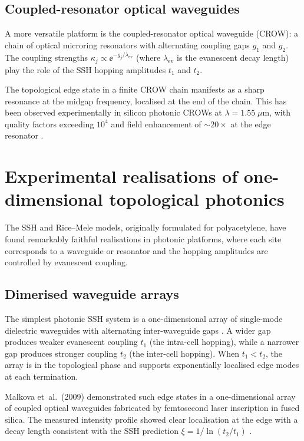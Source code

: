 \subsection{Coupled-resonator optical waveguides}
\label{sec:ch14-crow}

A more versatile platform is the coupled-resonator optical waveguide
(CROW): a chain of optical microring resonators with alternating
coupling gaps $g_1$ and $g_2$.  The coupling strengths
$\kappa_j\propto\ee^{-g_j/\lambda_{\mathrm{ev}}}$ (where
$\lambda_{\mathrm{ev}}$ is the evanescent decay length) play the role
of the SSH hopping amplitudes $t_1$ and $t_2$.

The topological edge state in a finite CROW chain manifests as a
sharp resonance at the midgap frequency, localised at the end of
the chain.  This has been observed experimentally in silicon photonic
CROWs at $\lambda=1.55\;\mu\mathrm{m}$, with quality factors
exceeding $10^4$ and field enhancement of $\sim 20\times$ at the
edge resonator \cite{ozawa2018topological}.

\section{Experimental realisations of one-dimensional topological photonics}
\label{sec:ch14-experimental-realisations}

The SSH and Rice--Mele models, originally formulated for polyacetylene,
have found remarkably faithful realisations in photonic platforms, where
each site corresponds to a waveguide or resonator and the hopping
amplitudes are controlled by evanescent coupling.

\subsection{Dimerised waveguide arrays}
\label{sec:ch14-dimerised-waveguide}

The simplest photonic SSH system is a one-dimensional array of
single-mode dielectric waveguides with alternating inter-waveguide
gaps \cite{wu2015scheme}.  A wider gap produces weaker evanescent coupling $t_1$ (the
intra-cell hopping), while a narrower gap produces stronger coupling
$t_2$ (the inter-cell hopping).  When $t_1<t_2$, the array is in
the topological phase and supports exponentially localised edge modes
at each termination.

Malkova et~al.\ (2009) demonstrated such edge states in a
one-dimensional array of coupled optical waveguides fabricated by
femtosecond laser inscription in fused silica.  The measured
intensity profile showed clear localisation at the edge with a decay
length consistent with the SSH prediction
$\xi=1/\ln(t_2/t_1)$ \cite{ozawa2018topological}.

